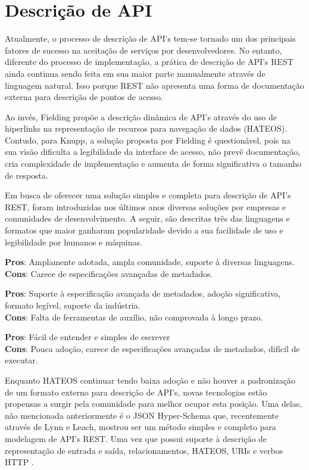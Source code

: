 \section[Descrição de API]{Descrição de API}

Atualmente, o processo de descrição de API's tem-se tornado um dos principais fatores de sucesso na aceitação de serviços por desenvolvedores. No entanto, diferente do processo de implementação, a prática de descrição de API's REST ainda continua sendo feita em sua maior parte manualmente através de linguagem natural. Isso porque REST não apresenta uma forma de documentação externa para descrição de pontos de acesso. \cite{LuckyEtAl2016}

Ao invés, Fielding propõe a descrição dinâmica de API's através do uso de hiperlinks na representação de recursos para navegação de dados (HATEOS). Contudo, para Knupp, a solução proposta por Fielding é questionável, pois na sua visão dificulta a legibilidade da interface de acesso, não prevê documentação, cria complexidade de implementação e aumenta de forma significativa o tamanho de resposta. \cite{Knupp2016}

Em busca de oferecer uma solução simples e completa para descrição de API's REST, foram introduzidas nos últimos anos diversas soluções por empresas e comunidades de desenvolvimento. A seguir, são descritas três das linguagens e formatos que maior ganharam popularidade devido a sua facilidade de uso e legibilidade por humanos e máquinas. \cite{Sandoval2015}

\begin{description}[leftmargin=8em,style=nextline]
  \item[\textbf{OpenAPI}] \textbf{Pros}: Amplamente adotada, ampla comunidade, suporte à diversas linguagens. \\ \textbf{Cons}: Carece de especificações avançadas de metadados.
  \item[\textbf{RAML}] \textbf{Pros}: Suporte à especificação avançada de metadados, adoção significativa, formato legível, suporte da indústria. \\ \textbf{Cons}: Falta de ferramentas de auxílio, não comprovada à longo prazo.
  \item[\textbf{API Blueprint}] \textbf{Pros}: Fácil de entender e simples de escrever \\ \textbf{Cons}: Pouca adoção, carece de especificações avançadas de metadados, difícil de executar.
\end{description}

Enquanto HATEOS continuar tendo baixa adoção e não houver a padronização de um formato externo para descrição de API's, novas tecnologias estão propensas a surgir pela comunidade para melhor ocupar esta posição. Uma delas, não mencionada anteriormente é o JSON Hyper-Schema que, recentemente através de Lynn e Leach, mostrou ser um método simples e completo para modelagem de API's REST. Uma vez que possui suporte à descrição de representação de entrada e saída, relacionamentos, HATEOS, URIs e verbos HTTP  \cite{LynnEtAl2016} \cite{Leach2014}.
